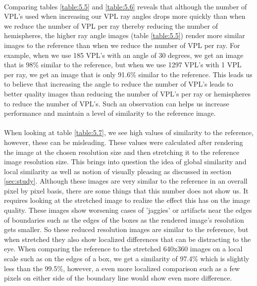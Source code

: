 \paragraph{}
Comparing tables \ref{table:5.5} and \ref{table:5.6} reveals that although the number of VPL's used when increasing our VPL ray angles drops more quickly than when we reduce the number of VPL per ray thereby reducing the number of hemispheres, the higher ray angle images (table \ref{table:5.5}) render more similar images to the reference than when we reduce the number of VPL per ray.  For example, when we use 185 VPL's with an angle of 30 degrees, we get an image that is 98\% similar to the reference, but when we use 1297 VPL's with 1 VPL per ray, we get an image that is only 91.6\% similar to the reference.  This leads us to believe that increasing the angle to reduce the number of VPL's leads to better quality images than reducing the number of VPL's per ray or hemispheres to reduce the number of VPL's.  Such an observation can helps us increase performance and maintain a level of similarity to the reference image.

\paragraph{}
When looking at table \ref{table:5.7}, we see high values of similarity to the reference, however, these can be misleading.  These values were calculated after rendering the image at the chosen resolution size and then stretching it to the reference image resolution size.  This brings into question the idea of global similarity and local similarity as well as notion of visually pleasing as discussed in section \ref{sec:study}.  Although these images are very similar to the reference in an overall pixel by pixel basis, there are some things that this number does not show us.  It requires looking at the stretched image to realize the effect this has on the image quality.  These images show worsening cases of 'jaggies' or artifacts near the edges of boundaries such as the edges of the boxes as the rendered image's resolution gets smaller.  So these reduced resolution images are similar to the reference, but when stretched they also show localized differences that can be distracting to the eye.  When comparing the reference to the stretched 640x360 images on a local scale such as on the edges of a box, we get a similarity of 97.4\% which is slightly less than the 99.5\%, however, a even more localized comparison such as a few pixels on either side of the boundary line would show even more difference.

